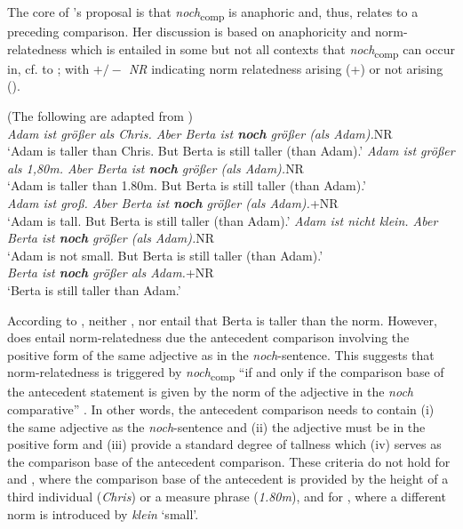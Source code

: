 \documentclass[output=paper]{langsci/langscibook}
\begin{document}
The core of \citeauthor{umbach2009a_comp}'s \citeyearpar{umbach2009a_comp} proposal is that \textit{noch}\textsubscript{comp} is anaphoric and, thus, relates to a preceding comparison. Her discussion is based on anaphoricity and norm-relatedness which is entailed in some but not all contexts that \textit{noch}\textsubscript{comp} can occur in, cf.  to ; with \textit{$+/-$ NR} indicating norm relatedness arising (+) or not arising (\textminus).

\ea \label{umbach_19} (The following are adapted from \citealt[ex. 19--21]{umbach2009a_comp}) \\ \ea \small{\itshape Adam ist größer als Chris. Aber Berta ist \textbf{noch} größer (als Adam).}\hfill \textminus NR\\ {`Adam is taller than Chris. But Berta is still taller (than Adam).'} \label{umbach_19a}
\ex\small{\itshape Adam ist größer als 1,80m. Aber Berta ist \textbf{noch} größer (als Adam).}\hfill \textminus NR\\ {`Adam is taller than 1.80m. But Berta is still taller (than Adam).'} \label{umbach_19b}\\
\z
\ex \label{umbach_20} \ea\small{\itshape Adam ist groß. Aber Berta ist \textbf{noch} größer (als Adam).}\hfill +NR\\ {`Adam is tall. But Berta is still taller (than Adam).'} \label{umbach_20a}
\ex\small{\itshape Adam ist nicht klein. Aber Berta ist \textbf{noch} größer (als Adam).}\hfill \textminus NR\\ {`Adam is not small. But Berta is still taller (than Adam).'} \label{umbach_20b}\\
\z
\ex \small{\itshape Berta ist \textbf{noch} größer als Adam.}\hfill +NR\\ {`Berta is still taller than Adam.'} \label{umbach_21}
\z


\noindent According to \citet{umbach2009a_comp}, neither ,  nor  entail that Berta is taller than the norm. However,  does entail norm-relatedness due the antecedent comparison involving the positive form of the same adjective as in the \textit{noch}-sentence. This suggests that norm-relatedness is triggered by \textit{noch}\textsubscript{comp} ``if and only if the comparison base of the antecedent statement is given by the norm of the adjective in the \textit{noch} comparative'' \citep[10]{umbach2009a_comp}. In other words, the antecedent comparison needs to contain (i) the same adjective as the \textit{noch}-sentence and (ii) the adjective must be in the positive form and (iii) provide a standard degree of tallness which (iv) serves as the comparison base of the antecedent comparison. These criteria do not hold for  and , where the comparison base of the antecedent is provided by the height of a third individual (\textit{Chris}) or a measure phrase (\textit{1.80m}), and for , where a different norm is introduced by \textit{klein} `small'.
\end{document}
